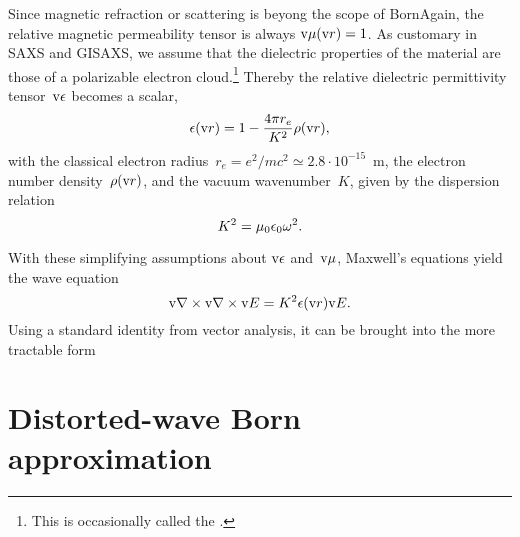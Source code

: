 Since magnetic refraction or scattering is beyong the scope of BornAgain,
the relative magnetic permeability tensor is always $\text{v}{\mu}(\text{v}{r})=1$.
%
%
As customary in SAXS and GISAXS,
%
%
we assume
that the dielectric properties of the material are those of a polarizable electron cloud.\footnote
{This is occasionally called the 
%
 \cite{Lau31}.}
Thereby the relative dielectric permittivity tensor~$\text{v}{\epsilon}$
%
%
becomes a scalar,
\begin{equation}
  \epsilon(\text{v}{r})=1-\frac{4\pi r_e}{K^2}\rho(\text{v}{r}),
\end{equation}
%
%
with the classical electron radius~$r_e=e^2/mc^2\simeq2.8\cdot10^{-15}$~m,
%
%
%
the electron number density~$\rho(\text{v}{r})$,
%
%
%
and the vacuum wavenumber~$K$,
given by the dispersion relation
\begin{equation}
  K^2 = \mu_0\epsilon_0\omega^2.
\end{equation}
%

With these simplifying assumptions about $\text{v}{\epsilon}$ and~$\text{v}{\mu}$,
Maxwell's equations yield the wave equation
\begin{equation}\label{ENabCrossNabE}
  \text{v}{\nabla}\times\text{v}{\nabla}\times\text{v}{E} = K^2\epsilon(\text{v}{r})\text{v}{E}.
\end{equation}
%
%
Using a standard identity from vector analysis, it can be brought into the more tractable form

%

\section{Distorted-wave Born approximation}\label{SDWBA}

